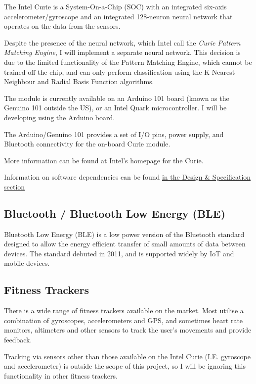 \documentclass[a4paper]{article}
\begin{document}
The Intel Curie is a System-On-a-Chip (SOC) with an integrated six-axis accelerometer/gyroscope and an integrated 128-neuron neural network that operates on the data from the sensors.

Despite the presence of the neural network, which Intel call the \textit{Curie Pattern Matching Engine}\cite{bgref6}, I will implement a separate neural network. This decision is due to the limited functionality of the Pattern Matching Engine, which cannot be trained off the chip, and can only perform classification using the K-Nearest Neighbour and Radial Basis Function algorithms.

The module is currently available on an Arduino 101 board (known as the Genuino 101 outside the US), or an Intel Quark microcontroller. I will be developing using the Arduino board.

The Arduino/Genuino 101 provides a set of I/O pins, power supply, and Bluetooth connectivity for the on-board Curie module.

More information can be found at Intel's homepage for the Curie\cite{bgref6}.

Information on software dependencies can be found \hyperref[subsec:dn_language]{in the Design \& Specification section}

\subsection{Bluetooth / Bluetooth Low Energy (BLE)}%
\label{subsec:bg_ble}

Bluetooth Low Energy\cite{bgref7} (BLE) is a low power version of the Bluetooth standard designed to allow the energy efficient transfer of small amounts of data between devices. The standard debuted in 2011, and is supported widely by IoT and mobile devices.

\subsection{Fitness Trackers}%
\label{subsec:bg_fitnesstrackers}

There is a wide range of fitness trackers available on the market. Most utilise a combination of gyroscopes, accelerometers and GPS, and sometimes heart rate monitors, altimeters and other sensors to track the user's movements and provide feedback.

Tracking via sensors other than those available on the Intel Curie (I.E. gyroscope and accelerometer) is outside the scope of this project, so I will be ignoring this functionality in other fitness trackers.
\end{document}
